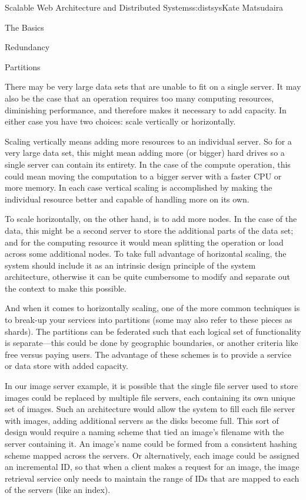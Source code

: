 \begin{aosachapter}{Scalable Web Architecture and Distributed Systems}{s:distsys}{Kate Matsudaira}
\begin{aosasect1}{The Basics}
\begin{aosasect2}{Redundancy}

\end{aosasect2}

\begin{aosasect2}{Partitions}

There may be very large data sets that are unable to fit on a single
server. It may also be the case that an operation requires too many
computing resources, diminishing performance, and therefore makes it
necessary to add capacity. In either case you have two choices: scale
vertically or horizontally.

Scaling vertically means adding more resources to an individual
server. So for a very large data set, this might mean adding more (or
bigger) hard drives so a single server can contain its entirety. In
the case of the compute operation, this could mean moving the
computation to a bigger server with a faster CPU or more memory. In
each case vertical scaling is accomplished by making the individual
resource better and capable of handling more on its own.

To scale horizontally, on the other hand, is to add more nodes. In the
case of the data, this might be a second server to store the
additional parts of the data set; and for the computing resource it
would mean splitting the operation or load across some additional
nodes. To take full advantage of horizontal scaling, the system should
include it as an intrinsic design principle of the system
architecture, otherwise it can be quite cumbersome to modify and
separate out the context to make this possible.

And when it comes to horizontally scaling, one of the more common
techniques is to break-up your services into partitions (some may also
refer to these pieces as shards). The partitions can be federated such
that each logical set of functionality is separate---this could be
done by geographic boundaries, or another criteria like free versus
paying users. The advantage of these schemes is to provide a service
or data store with added capacity.

In our image server example, it is possible that the single file
server used to store images could be replaced by multiple file
servers, each containing its own unique set of images. Such an
architecture would allow the system to fill each file server with
images, adding additional servers as the disks become full. This sort
of design would require a naming scheme that tied an image’s filename
with the server containing it. An image’s name could be formed from a
consistent hashing scheme mapped across the servers. Or alternatively,
each image could be assigned an incremental ID, so that when a client
makes a request for an image, the image retrieval service only needs
to maintain the range of IDs that are mapped to each of the servers
(like an index).


\end{aosasect2}
\end{aosasect1}
\end{aosachapter}
